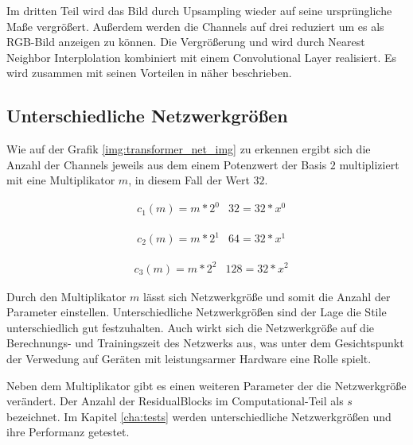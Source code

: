 Im dritten Teil wird das Bild durch Upsampling wieder auf seine ursprüngliche Maße vergrößert. Außerdem werden die Channels auf drei reduziert um es als RGB-Bild anzeigen zu können. Die Vergrößerung und wird durch Nearest Neighbor Interplolation kombiniert mit einem Convolutional Layer realisiert.
Es wird zusammen mit seinen Vorteilen in \cite{odena2016deconvolution} näher beschrieben.

\pagebreak

\subsection{Unterschiedliche Netzwerkgrößen}

Wie auf der Grafik \ref{img:transformer_net_img} zu erkennen ergibt sich die Anzahl der Channels jeweils aus dem einem Potenzwert der Basis $ 2 $ multipliziert mit eine Multiplikator $ m $, in diesem Fall der Wert $ 32 $.

\begin{align}
	& c_{1}(m) = m * 2^{0}
	& 32 = 32 * x^{0}
\end{align}

\begin{align}
	& c_{2}(m) = m * 2^{1}
	& 64 = 32 * x^{1}
\end{align}

\begin{align}
	& c_{3}(m) = m * 2^{2}
	& 128 = 32 * x^{2}
\end{align}

Durch den Multiplikator $ m $ lässt sich Netzwerkgröße und somit die Anzahl der Parameter einstellen. Unterschiedliche Netzwerkgrößen sind der Lage die Stile unterschiedlich gut festzuhalten. Auch wirkt sich die Netzwerkgröße auf die Berechnungs- und Trainingszeit des Netzwerks aus, was unter dem Gesichtspunkt der Verwedung auf Geräten mit leistungsarmer Hardware eine Rolle spielt.

Neben dem Multiplikator gibt es einen weiteren Parameter der die Netzwerkgröße verändert. Der Anzahl der ResidualBlocks im Computational-Teil als $ s $ bezeichnet. Im Kapitel \ref{cha:tests} werden unterschiedliche Netzwerkgrößen und ihre Performanz getestet.